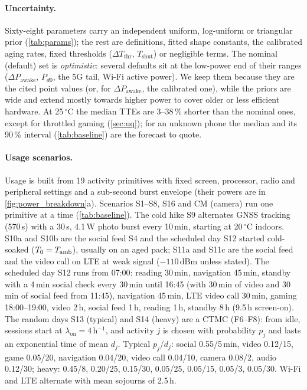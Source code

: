 \paragraph{Uncertainty.} Sixty-eight parameters carry an independent uniform, log-uniform or triangular prior
(\cref{tab:params}); the rest are definitions, fitted shape constants, the calibrated aging rates, fixed thresholds
($\Delta T_{\mathrm{thr}}$, $T_{\mathrm{shut}}$) or negligible terms. The nominal (default) set is
\emph{optimistic}: several defaults sit at the low-power end of their ranges ($\Delta P_{\mathrm{awake}}$, $P_{d0}$,
the 5G tail, Wi-Fi active power). We keep them because they are the cited point values (or, for $\Delta P_{\mathrm{awake}}$,
the calibrated one), while the priors are wide and extend mostly towards higher power to cover older or less
efficient hardware. At 25\,$^\circ$C the median TTEs
are 3--38\,\% shorter than the nominal ones, except for throttled gaming (\cref{sec:uq}); for an unknown phone the
median and its 90\,\% interval (\cref{tab:baseline}) are the forecast to quote.

\paragraph{Usage scenarios.}\label{sec:usage} Usage is built from 19 activity primitives with fixed screen,
processor, radio and peripheral settings and a sub-second burst envelope (their powers are in
\cref{fig:power_breakdown}a). Scenarios S1--S8, S16 and CM (camera) run one primitive at a time
(\cref{tab:baseline}). The cold hike S9
alternates GNSS tracking (570\,s) with a 30\,s, 4.1\,W photo burst every 10\,min, starting at 20\,$^\circ$C
indoors. S10a and S10b are the social feed S4 and the scheduled day S12 started cold-soaked ($T_0=T_{\mathrm{amb}}$),
usually on an aged pack; S11a
and S11c are the social feed and the video call on LTE at weak signal ($-110$\,dBm unless stated). The scheduled
day S12 runs from 07:00: reading 30\,min, navigation 45\,min, standby with a 4\,min social check every 30\,min
until 16:45 (with 30\,min of video and 30\,min of social feed from 11:45), navigation 45\,min, LTE video call
30\,min, gaming 18:00--19:00, video 2\,h, social feed 1\,h, reading 1\,h, standby 8\,h (9.5\,h screen-on). The
random days S13 (typical) and S14 (heavy) are a CTMC
(F6--F8): from idle, sessions start at $\lambda_{\mathrm{on}}=4$\,h$^{-1}$, and activity $j$ is chosen with
probability $p_j$ and lasts an exponential time of mean $d_j$. Typical $p_j$/$d_j$: social 0.55/5\,min, video
0.12/15, game 0.05/20, navigation 0.04/20, video call 0.04/10, camera 0.08/2, audio 0.12/30; heavy: 0.45/8,
0.20/25, 0.15/30, 0.05/25, 0.05/15, 0.05/3, 0.05/30. Wi-Fi and LTE alternate with mean sojourns of 2.5\,h.

